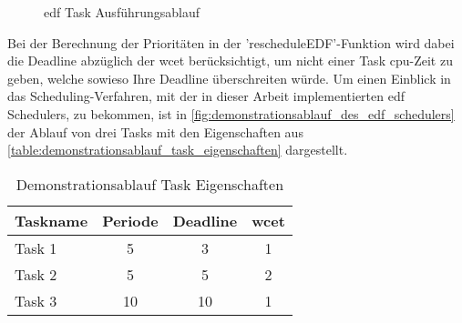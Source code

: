 \documentclass[../EDF Master Thesis.tex]{subfiles}
\begin{document}
    \begin{figure}[ht!]
        \begin{center}
        \end{center}
        \caption{\ac{edf} Task Ausführungsablauf}
        \label{fig:edf_task_ausfuehrungsablauf}
    \end{figure}
    
    Bei der Berechnung der Prioritäten in der 'rescheduleEDF'-Funktion wird dabei die Deadline abzüglich der \ac{wcet} berücksichtigt, um nicht einer Task \ac{cpu}-Zeit zu geben, welche sowieso Ihre Deadline überschreiten würde.
    Um einen Einblick in das Scheduling-Verfahren, mit der in dieser Arbeit implementierten \ac{edf} Schedulers, zu bekommen, ist in \autoref{fig:demonstrationsablauf_des_edf_schedulers} der Ablauf von drei Tasks mit den Eigenschaften aus \autoref{table:demonstrationsablauf_task_eigenschaften} dargestellt.

    \begin{table}[ht!]
        \centering
        \begin{tabular}{l|c|c|c}
            Taskname & Periode & Deadline & \ac{wcet} \\
            \hline
            Task 1 & 5 & 3 & 1 \\
            Task 2 & 5 & 5 & 2 \\
            Task 3 & 10 & 10 & 1 
        \end{tabular}
        \caption{Demonstrationsablauf Task Eigenschaften}
        \label{table:demonstrationsablauf_task_eigenschaften}
    \end{table}
\end{document}
